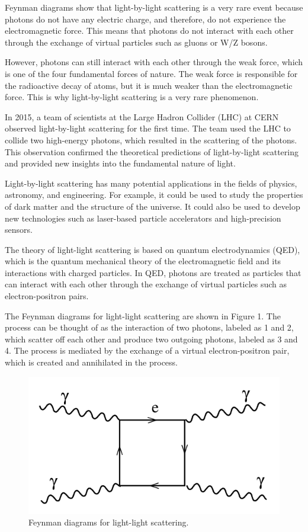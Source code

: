 \documentclass{article}
\begin{document}
Feynman diagrams show that light-by-light scattering is a very rare event because photons do not have any electric charge, and therefore, do not experience the electromagnetic force. This means that photons do not interact with each other through the exchange of virtual particles such as gluons or W/Z bosons.

However, photons can still interact with each other through the weak force, which is one of the four fundamental forces of nature. The weak force is responsible for the radioactive decay of atoms, but it is much weaker than the electromagnetic force. This is why light-by-light scattering is a very rare phenomenon.

In 2015, a team of scientists at the Large Hadron Collider (LHC) at CERN observed light-by-light scattering for the first time. The team used the LHC to collide two high-energy photons, which resulted in the scattering of the photons. This observation confirmed the theoretical predictions of light-by-light scattering and provided new insights into the fundamental nature of light.

Light-by-light scattering has many potential applications in the fields of physics, astronomy, and engineering. For example, it could be used to study the properties of dark matter and the structure of the universe. It could also be used to develop new technologies such as laser-based particle accelerators and high-precision sensors.

The theory of light-light scattering is based on quantum electrodynamics (QED), which is the quantum mechanical theory of the electromagnetic field and its interactions with charged particles. In QED, photons are treated as particles that can interact with each other through the exchange of virtual particles such as electron-positron pairs.

The Feynman diagrams for light-light scattering are shown in Figure 1. The process can be thought of as the interaction of two photons, labeled as 1 and 2, which scatter off each other and produce two outgoing photons, labeled as 3 and 4. The process is mediated by the exchange of a virtual electron-positron pair, which is created and annihilated in the process.

\begin{figure}[h]
	\centering
	\includegraphics[width=0.5\linewidth]{Feynman-diagram.png}
	\caption{Feynman diagrams for light-light scattering.}
	\label{fig:light-light-scattering-feynman}
\end{figure}
\end{document}

